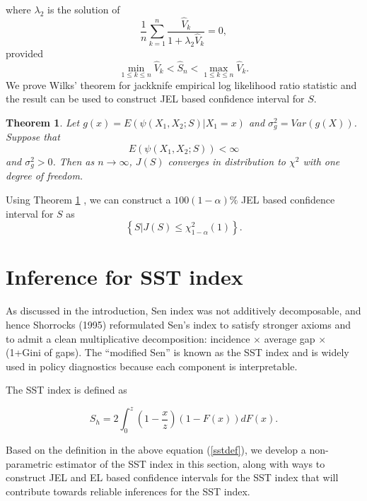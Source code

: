 \documentclass[11pt]{article}
\newtheorem{theorem}{Theorem}
\begin{document}
where $\lambda_{2}$ is the solution of
\begin{equation}\label{lambda2}
  \frac{1}{n}\sum_{k=1}^{n}{\frac{\widehat{V}_{k}}{1+\lambda_{2} \widehat{V}_{k}}}=0,
\end{equation}
    provided
\begin{equation*}
  \min_{{1\le k\le n}}\widehat{V}_{k}<\widehat{S}_n<  \max_{1\le k\le n}\widehat{V}_{k}.
\end{equation*}
We prove Wilks' theorem for jackknife empirical log likelihood ratio statistic and the result can be used to construct JEL based confidence interval for $S$.
\begin{theorem} \label{thm:senjel}
 Let $g(x)=E\left(\psi(X_1,X_2;S)|X_1=x\right)$ and $\sigma_{g}^{2}=Var(g(X))$.
  Suppose that $$E\left(\psi(X_1,X_2;S)\right)<\infty$$  and $\sigma_{g}^{2}>0$. Then as $n\rightarrow \infty$, $J(S)$ converges in distribution to $\chi^2$ with one degree of freedom.
\end{theorem}
Using Theorem \ref{thm:senjel} , we can construct  a $100(1-\alpha) \%$ JEL based confidence interval for $S$ as $$\left\{S|J(S)\le \chi^2_{1-\alpha}(1)\right\}.$$
\section{Inference for SST index}


As discussed in the introduction, Sen index was not additively decomposable, and hence Shorrocks (1995) reformulated Sen’s index to satisfy stronger axioms and to admit a clean multiplicative decomposition: incidence $\times$ average gap $\times$ (1+Gini of gaps). The “modified Sen” is known as the SST index and is widely used in policy diagnostics because each component is interpretable.

 The SST index is defined as


\begin{equation}\label{sstdef}
  S_{h}= 2\int_{0}^{z}\left(1-\frac{x}{z}\right)(1-F(x))dF(x).
\end{equation}

Based on the definition in the above equation (\ref{sstdef}), we develop a non-parametric estimator of the SST index in this section, along with ways to construct JEL and EL based confidence intervals for the SST index that will contribute towards reliable inferences for the SST index.
\end{document}
